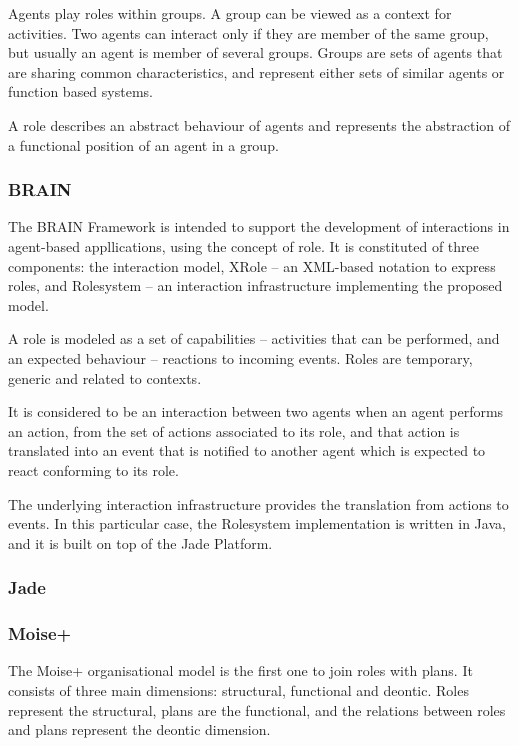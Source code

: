 \documentclass{article}
\begin{document}
Agents play roles within groups. A group can be viewed as a context
for activities. Two agents can interact only if they are member of
the same group, but usually an agent is member of several groups.
Groups are sets of agents that are sharing common characteristics, and
represent either sets of similar agents or function based systems.

A role describes an abstract behaviour of agents and represents the
abstraction of a functional position of an agent in a group.

\subsubsection{BRAIN} The BRAIN Framework is intended to support
the development of interactions in agent-based appllications, using
the concept of role. It is constituted of three components: the
interaction model, XRole -- an XML-based notation to express roles,
and Rolesystem -- an interaction infrastructure implementing the
proposed model.

A role is modeled as a set of capabilities -- activities that can be
performed, and an expected behaviour -- reactions to incoming events.
Roles are temporary, generic and related to contexts.

It is considered to be an interaction between two agents when an
agent performs an action, from the set of actions associated to its
role, and that action is translated into an event that is notified to
another agent which is expected to react conforming to its role.

The underlying interaction infrastructure provides the translation
from actions to events. In this particular case, the Rolesystem
implementation is written in Java, and it is built on top of the Jade
Platform.

\subsubsection{Jade} 

\subsubsection{Moise+} The Moise+ organisational model is the first
one to join roles with plans. It consists of three main dimensions:
structural, functional and deontic. Roles represent the structural,
plans are the functional, and the relations between roles and plans
represent the deontic dimension.
\end{document}
